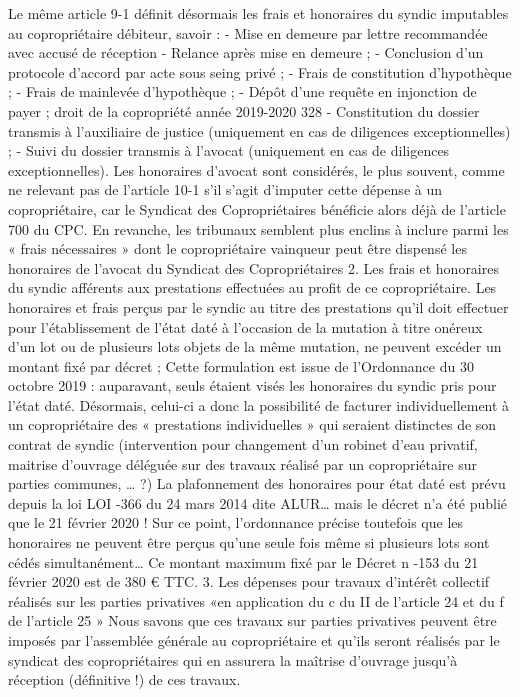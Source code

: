 		Le même article 9-1 définit désormais les frais et honoraires du syndic imputables au copropriétaire débiteur, savoir :
		- Mise en demeure par lettre recommandée avec accusé de réception
		- Relance après mise en demeure ;
		- Conclusion d’un protocole d’accord par acte sous seing privé ;
		- Frais de constitution d’hypothèque ;
		- Frais de mainlevée d’hypothèque ;
		- Dépôt d’une requête en injonction de payer ;
		droit de la copropriété année 2019-2020
		328
		- Constitution du dossier transmis à l’auxiliaire de justice (uniquement en cas de diligences exceptionnelles) ;
		- Suivi du dossier transmis à l’avocat (uniquement en cas de diligences exceptionnelles).
		Les honoraires d’avocat sont considérés, le plus souvent, comme ne relevant pas de l’article 10-1 s’il s’agit d’imputer cette dépense à un copropriétaire, car le Syndicat des Copropriétaires bénéficie alors déjà de l’article 700 du CPC. En revanche, les tribunaux semblent plus enclins à inclure parmi les « frais nécessaires » dont le copropriétaire vainqueur peut être dispensé les honoraires de l’avocat du Syndicat des Copropriétaires
		2. Les frais et honoraires du syndic afférents aux prestations effectuées au profit de ce copropriétaire. Les honoraires et frais perçus par le syndic au titre des prestations qu'il doit effectuer pour l'établissement de l'état daté à l'occasion de la mutation à titre onéreux d'un lot ou de plusieurs lots objets de la même mutation, ne peuvent excéder un montant fixé par décret ;
		Cette formulation est issue de l’Ordonnance du 30 octobre 2019 : auparavant, seuls étaient visés les honoraires du syndic pris pour l’état daté. Désormais, celui-ci a donc la possibilité de facturer individuellement à un copropriétaire des « prestations individuelles » qui seraient distinctes de son contrat de syndic (intervention pour changement d’un robinet d’eau privatif, maitrise d’ouvrage déléguée sur des travaux réalisé par un copropriétaire sur parties communes, … ?)
		La plafonnement des honoraires pour état daté est prévu depuis la loi LOI -366 du 24 mars 2014 dite ALUR… mais le décret n’a été publié que le 21 février 2020 ! Sur ce point, l’ordonnance précise toutefois que les honoraires ne peuvent être perçus qu’une seule fois même si plusieurs lots sont cédés simultanément…
		Ce montant maximum fixé par le Décret n -153 du 21 février 2020 est de 380 € TTC.
		3. Les dépenses pour travaux d’intérêt collectif réalisés sur les parties privatives «en application du c du II de l’article 24 et du f de l’article 25 »
		Nous savons que ces travaux sur parties privatives peuvent être imposés par l’assemblée générale au copropriétaire et qu’ils seront réalisés par le syndicat des copropriétaires qui en assurera la maîtrise d’ouvrage jusqu’à réception (définitive !) de ces travaux.
